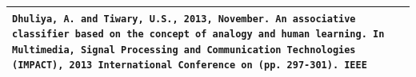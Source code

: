 \documentclass[a4paper,12pt]{article}
\begin{document}
\begin{flushleft}
\begin{tabular}{ m{} M{0.05\textwidth}}
\rule[13pt]{0ex}{0ex}\texttt{Dhuliya, A. and Tiwary, U.S., 2013, November. An associative classifier based on the concept of analogy and human learning. In Multimedia, Signal Processing and Communication Technologies (IMPACT), 2013 International Conference on (pp. 297-301). IEEE} & \\ \hline
\end{tabular}

%
%
%
%
%



\end{flushleft}
\end{document}
